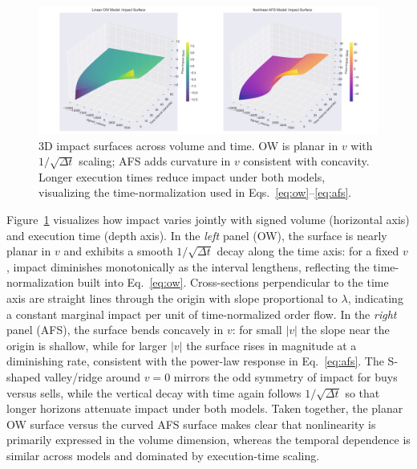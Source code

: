 \documentclass{article}
\begin{document}
\begin{figure}[H]
\centering
\includegraphics[width=\textwidth]{figures/04_3d_impact_surfaces.png}
\caption{3D impact surfaces across volume and time. OW is planar in $v$ with $1/\sqrt{\Delta t}$ scaling; AFS adds curvature in $v$ consistent with concavity. Longer execution times reduce impact under both models, visualizing the time-normalization used in Eqs.~\eqref{eq:ow}--\eqref{eq:afs}.}
\label{fig:3d_surfaces}
\end{figure}

Figure~\ref{fig:3d_surfaces} visualizes how impact varies jointly with signed volume (horizontal axis) and execution time (depth axis). In the \emph{left} panel (OW), the surface is nearly planar in $v$ and exhibits a smooth $1/\sqrt{\Delta t}$ decay along the time axis: for a fixed $v$, impact diminishes monotonically as the interval lengthens, reflecting the time-normalization built into Eq.~\eqref{eq:ow}. Cross-sections perpendicular to the time axis are straight lines through the origin with slope proportional to $\lambda$, indicating a constant marginal impact per unit of time-normalized order flow. In the \emph{right} panel (AFS), the surface bends concavely in $v$: for small $|v|$ the slope near the origin is shallow, while for larger $|v|$ the surface rises in magnitude at a diminishing rate, consistent with the power-law response in Eq.~\eqref{eq:afs}. The S-shaped valley/ridge around $v=0$ mirrors the odd symmetry of impact for buys versus sells, while the vertical decay with time again follows $1/\sqrt{\Delta t}$ so that longer horizons attenuate impact under both models. Taken together, the planar OW surface versus the curved AFS surface makes clear that nonlinearity is primarily expressed in the volume dimension, whereas the temporal dependence is similar across models and dominated by execution-time scaling.
\end{document}
